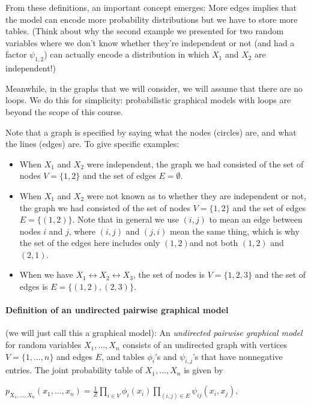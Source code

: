 \documentclass[6008notes.tex]{subfiles}
\begin{document}
From these definitions, an important concept emerges: More edges implies that the model can encode more probability distributions but we have to store more tables. (Think about why the second example we presented for two random variables where we don't know whether they're independent or not (and had a factor $\psi_{1, 2}$) can actually encode a distribution in which $X_1$ and $X_2$ are independent!)

Meanwhile, in the graphs that we will consider, we will assume that there are no loops. We do this for simplicity: probabilistic graphical models with loops are beyond the scope of this course.

Note that a graph is specified by saying what the nodes (circles) are, and what the lines (edges) are. To give specific examples:

\begin{itemize}
\item When $X_1$ and $X_2$ were independent, the graph we had consisted of the set of nodes $V=\{ 1, 2\}$ and the set of edges $E=\emptyset$.

\item When $X_1$ and $X_2$ were not known as to whether they are independent or not, the graph we had consisted of the set of nodes $V=\{ 1, 2\}$ and the set of edges $E=\{(1,2)\}$. Note that in general we use $(i,j)$ to mean an edge between nodes $i$ and $j$, where $(i,j)$ and $(j,i)$ mean the same thing, which is why the set of the edges here includes only $(1,2)$and not both $(1,2)$ and $(2,1)$.

\item When we have $X_1 \leftrightarrow X_2 \leftrightarrow X_3$, the set of nodes is $V=\{1,2,3\}$ and the set of edges is $E=\{(1,2),(2,3)\}$.
\end{itemize}

\paragraph{Definition of an undirected pairwise graphical model} (we will just call this a graphical model): An \textit{undirected pairwise graphical model} for random variables $X_1, \dots , X_n$ consists of an undirected graph with vertices $V=\{1, \dots ,n\}$ and edges $E$, and tables $\phi_i$'s and $\psi_{i, j}$'s that have nonnegative entries. The joint probability table of $X_1, \dots , X_n$ is given by

{\centering$p_{X_1, \dots , X_ n}(x_1, \dots , x_ n) =\frac{1}{Z}\prod _{i\in V}\phi _{i}(x_{i})\prod _{(i,j)\in E}\psi _{ij}(x_{i},x_{j}),$ \par}
\end{document}
